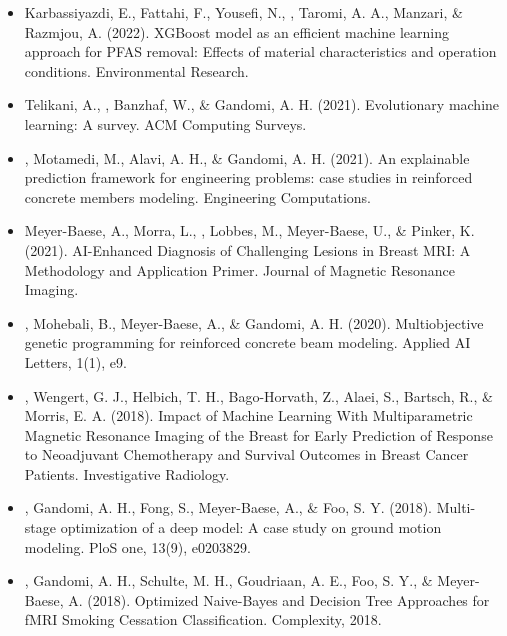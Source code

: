 \documentclass[]{template}
\begin{document}
\sectionsep 
{}
\begin{itemize}


\item Karbassiyazdi, E., Fattahi, F., Yousefi, N., , Taromi, A. A., Manzari, \& Razmjou, A. (2022). XGBoost model as an efficient machine learning approach for PFAS removal: Effects of material characteristics and operation conditions. Environmental Research.

\item Telikani, A., , Banzhaf, W., \& Gandomi, A. H. (2021). Evolutionary machine learning: A survey. ACM Computing Surveys.

\item {}, Motamedi, M., Alavi, A. H., \& Gandomi, A. H. (2021). An explainable prediction framework for engineering problems: case studies in reinforced concrete members modeling. Engineering Computations.

\item Meyer-Baese, A., Morra, L., , Lobbes, M., Meyer-Baese, U., \& Pinker, K. (2021). AI-Enhanced Diagnosis of Challenging Lesions in Breast MRI: A Methodology and Application Primer. Journal of Magnetic Resonance Imaging.

\item {}, Mohebali, B., Meyer-Baese, A., \& Gandomi, A. H. (2020). Multiobjective genetic programming for reinforced concrete beam modeling. Applied AI Letters, 1(1), e9.

\item {}, Wengert, G. J., Helbich, T. H., Bago-Horvath, Z., Alaei, S., Bartsch, R., \& Morris, E. A. (2018). Impact of Machine Learning With Multiparametric Magnetic Resonance Imaging of the Breast for Early Prediction of Response to Neoadjuvant Chemotherapy and Survival Outcomes in Breast Cancer Patients. Investigative Radiology.

\item {}, Gandomi, A. H., Fong, S., Meyer-Baese, A., \& Foo, S. Y. (2018). Multi-stage optimization of a deep model: A case study on ground motion modeling. PloS one, 13(9), e0203829.


\item {}, Gandomi, A. H., Schulte, M. H., Goudriaan, A. E., Foo, S. Y., \& Meyer-Baese, A. (2018). Optimized Naive-Bayes and Decision Tree Approaches for fMRI Smoking Cessation Classification. Complexity, 2018.



\end{itemize}
\end{document}
